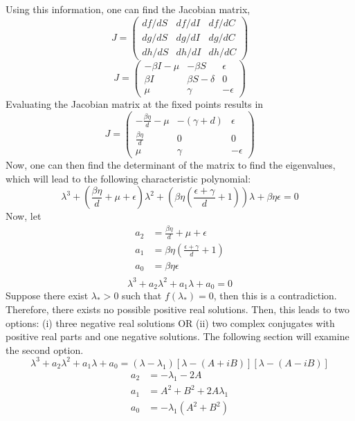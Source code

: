 \documentclass[a4paper, final, 12pt]{article}
\numberwithin{equation}{section}
\begin{document}
Using this information, one can find the Jacobian matrix, \\
$$ J = \begin{pmatrix} df/dS & df/dI & df/dC \\ dg/dS & dg/dI & dg/dC \\ dh/dS & dh/dI & dh/dC\end{pmatrix}$$
$$ J = \begin{pmatrix}-\beta I - \mu & -\beta S & \epsilon \\ \beta I & \beta S - \delta & 0\\ \mu & \gamma & -\epsilon \end{pmatrix}$$
Evaluating the Jacobian matrix at the fixed points results in\\
$$ J = \begin{pmatrix}-\frac{\beta \eta}{d} - \mu & -(\gamma + d) & \epsilon \\ \frac{\beta \eta}{d} & 0 & 0\\ \mu & \gamma & -\epsilon \end{pmatrix}$$
Now, one can then find the determinant of the matrix to find the eigenvalues, which will lead to the following characteristic polynomial:\\
$$\lambda^3+(\frac{\beta \eta}{d} + \mu + \epsilon)\lambda^2 + (\beta \eta(\frac{\epsilon + \gamma}{d}+1))\lambda + \beta \eta \epsilon = 0$$
Now, let\\
\begin{equation} \label{eq1}
\begin{split}
    a_2 & = \frac{\beta \eta}{d} + \mu + \epsilon\\
    a_1 & = \beta \eta (\frac{\epsilon + \gamma}{d}+1)\\
    a_0 & = \beta \eta \epsilon\\
\end{split}
\end{equation}
$$\lambda^3+a_2\lambda^2+a_1\lambda + a_0 = 0$$
\hspace{22pt}Suppose there exist $\lambda_* > 0$ such that $f(\lambda_*)=0$, then this is a contradiction. Therefore, there exists no possible positive real solutions. Then, this leads to two options: (i) three negative real solutions OR (ii) two complex conjugates with positive real parts and one negative solutions. The following section will examine the second option. \\
$$\lambda^3+a_2\lambda^2+a_1\lambda+a_0 = (\lambda-\lambda_1)[\lambda-(A+iB)][\lambda-(A-iB)]$$
\begin{equation} \label{eq1}
\begin{split}
    a_2 & = -\lambda_1-2A\\
    a_1 & = A^2+B^2+2A\lambda_1\\
    a_0 & = -\lambda_1(A^2+B^2)\\
\end{split}
\end{equation}
\end{document}
